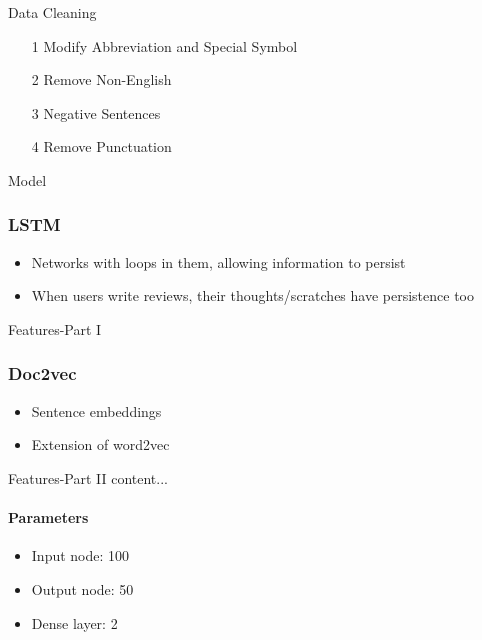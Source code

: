 \documentclass[10pt]{beamer}
\begin{document}
\begin{frame}{Data Cleaning}


\begin{itemize}

	\item[1] Modify Abbreviation and Special Symbol

	\item[2] Remove Non-English

	\item[3] Negative Sentences
	
	\item[4] Remove Punctuation

\end{itemize}

\end{frame}
\begin{frame}{Model}
\frametitle{LSTM}
\begin{itemize}
	\item Networks with loops in them, allowing information to persist
	\item When users write reviews, their thoughts/scratches have persistence too
\end{itemize}

\begin{frame}{Features-Part I}
\frametitle{Doc2vec}
\begin{itemize}
	\item Sentence embeddings
	\item Extension of word2vec
\end{itemize}
\end{frame}

\begin{frame}{Features-Part II}
content...
\end{frame}

\framesubtitle{Parameters}
\begin{itemize}
	\item Input node: 100
	\item Output node: 50
	\item Dense layer: 2
\end{itemize}
\end{frame}
\end{document}
